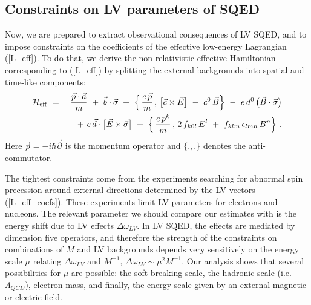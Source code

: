 \documentclass[12pt]{revtex4}
\begin{document}
\subsection{Constraints on LV parameters of SQED}


Now, we are prepared to extract observational consequences of LV SQED,
and to impose constraints on the coefficients of the effective low-energy
Lagrangian (\ref{L_eff}). To do that, we derive the non-relativistic
effective Hamiltonian corresponding to (\ref{L_eff}) by splitting the
external backgrounds into spatial and  time-like components: 
\begin{eqnarray}
        \mathcal{H}_{\rm eff} 
        & ~=~ &
        \frac{\vec{p} \cdot \vec{a}}
                  {m}
        ~+~
        \vec{b} \cdot \vec{\sigma}
        ~+~
        \Big\{\, 
                \frac{e\, \vec{p}}
                    {m}
                \, ,\, 
                \big[ \vec{c} \times \vec{E} \big]
                ~-~
                c^0\, \vec{B} 
        \Big\}
        ~-~ 
        e \, d^0 \, \big( \vec{B} \cdot \vec{\sigma} \big)
\nonumber        \\
\label{H_eff}
        & &
        ~+~
        e\, \vec{d} \cdot
        \big[ \vec{E} \times \vec{\sigma} \big]
        ~+~
        \Big\{\, 
                \frac{e\, p^k}
                    {m}
                \,,\, 
                2\, f_{k0l}\, E^l 
                ~+~
                f_{klm} \,\epsilon_{lmn}\, 
                B^n
        \Big\}~. 
\end{eqnarray}
%
Here $ \vec{p} = - i \hbar \vec{\partial} $ is the momentum operator
and $\{.,.\}$ denotes the anti-commutator. 


The tightest constraints come from the experiments searching for 
abnormal spin precession around external directions determined by the
LV vectors (\ref{L_eff_coefs}). These experiments limit LV parameters 
for electrons and nucleons. The relevant parameter we should compare 
our estimates with is the energy shift due to LV effects 
$\Delta \omega_{LV}$. In LV SQED, the effects are mediated by
dimension five operators, and therefore the strength of the
constraints on combinations of $M$ and LV backgrounds depends very
sensitively on the energy scale $\mu$ relating $\Delta \omega_{LV}$
and $M^{-1}$, $\Delta \omega_{LV} \sim \mu^2 M^{-1}$. Our analysis
shows that several possibilities for $\mu$ are possible: the soft
breaking scale, the hadronic scale (i.e. $\Lambda_{QCD}$), electron
mass, and finally, the energy scale given by an external magnetic or
electric field. 
\end{document}
